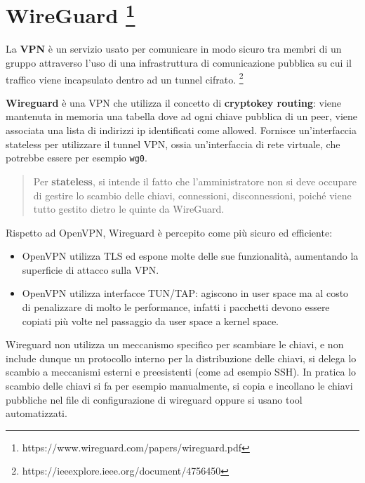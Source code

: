\section[WireGuard ]{\texorpdfstring{WireGuard
\footnote{\label{fn:ref_27}https://www.wireguard.com/papers/wireguard.pdf}}{WireGuard }}\label{wireguard-2}

La \textbf{VPN} è un servizio usato per comunicare in modo sicuro tra
membri di un gruppo attraverso l'uso di una infrastruttura di
comunicazione pubblica su cui il traffico viene incapsulato dentro ad un
tunnel cifrato. \footnote{\label{fn:ref_28}https://ieeexplore.ieee.org/document/4756450}

\textbf{Wireguard} è una VPN che utilizza il concetto di
\textbf{cryptokey routing}: viene mantenuta in memoria una tabella dove
ad ogni chiave pubblica di un peer, viene associata una lista di
indirizzi ip identificati come allowed. Fornisce un'interfaccia
stateless per utilizzare il tunnel VPN, ossia un'interfaccia di rete
virtuale, che potrebbe essere per esempio \passthrough{\lstinline!wg0!}.

\begin{quote}
Per \textbf{stateless}, si intende il fatto che l'amministratore non si
deve occupare di gestire lo scambio delle chiavi, connessioni,
disconnessioni, poiché viene tutto gestito dietro le quinte da
WireGuard.
\end{quote}

Rispetto ad OpenVPN, Wireguard è percepito come più sicuro ed
efficiente:

\begin{itemize}
\tightlist
\item
  OpenVPN utilizza TLS ed espone molte delle sue funzionalità,
  aumentando la superficie di attacco sulla VPN.
\item
  OpenVPN utilizza interfacce TUN/TAP: agiscono in user space ma al
  costo di penalizzare di molto le performance, infatti i pacchetti
  devono essere copiati più volte nel passaggio da user space a kernel
  space.
\end{itemize}

Wireguard non utilizza un meccanismo specifico per scambiare le chiavi,
e non include dunque un protocollo interno per la distribuzione delle
chiavi, si delega lo scambio a meccanismi esterni e preesistenti (come
ad esempio SSH). In pratica lo scambio delle chiavi si fa per esempio
manualmente, si copia e incollano le chiavi pubbliche nel file di
configurazione di wireguard oppure si usano tool automatizzati.

